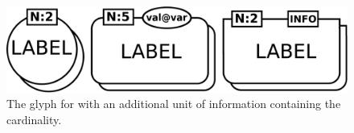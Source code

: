 \begin{figure}[H]
  \centering
  \includegraphics[scale = 0.3]{images/multimer}
  \caption{The \PD glyph for  with an additional unit of information containing the cardinality.}
  \label{fig:multimer}
\end{figure}






